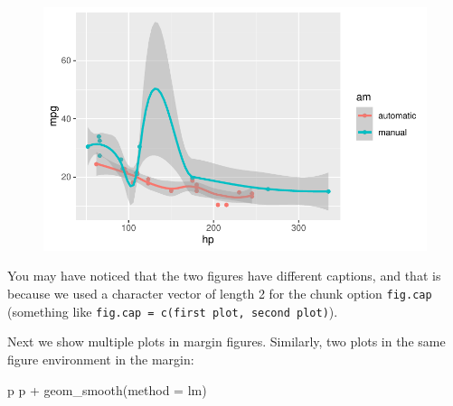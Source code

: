 \documentclass[
  letterpaper,
  DIV=11,
  numbers=noendperiod,
  oneside]{scrartcl}
\newenvironment{Shaded}{\begin{snugshade}}{\end{snugshade}}
\newcommand{\AttributeTok}[1]{\textcolor[rgb]{0.40,0.45,0.13}{#1}}
\newcommand{\FunctionTok}[1]{\textcolor[rgb]{0.28,0.35,0.67}{#1}}
\newcommand{\NormalTok}[1]{\textcolor[rgb]{0.00,0.23,0.31}{#1}}
\newcommand{\SpecialCharTok}[1]{\textcolor[rgb]{0.37,0.37,0.37}{#1}}
\newcommand{\StringTok}[1]{\textcolor[rgb]{0.13,0.47,0.30}{#1}}
\begin{document}
\begin{figure}[H]


{\centering \includegraphics{cv_files/figure-pdf/fig-two-separate-2.pdf}

}

\end{figure}

You may have noticed that the two figures have different captions, and
that is because we used a character vector of length 2 for the chunk
option \texttt{fig.cap} (something like
\texttt{fig.cap\ =\ c(\textquotesingle{}first\ plot\textquotesingle{},\ \textquotesingle{}second\ plot\textquotesingle{})}).

Next we show multiple plots in margin figures. Similarly, two plots in
the same figure environment in the margin:

\begin{Shaded}
\begin{Highlighting}[]
\NormalTok{p}
\NormalTok{p }\SpecialCharTok{+} \FunctionTok{geom\_smooth}\NormalTok{(}\AttributeTok{method =} \StringTok{\textquotesingle{}lm\textquotesingle{}}\NormalTok{)}
\end{Highlighting}
\end{Shaded}
\end{document}
